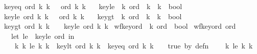 \begin{isabellebody}
{\isachardoublequoteopen}key{\isacharunderscore}eq\ ord\ k{}\ k{}\ {\isacharequal}\ {\isacharparenleft}\ ord\ k{}\ k{}\ {\isacharequal}\ {}{\isacharparenright}{\isachardoublequoteclose}\isanewline
\isanewline
{}\isamarkupfalse%
\ key{\isacharunderscore}le\ {\isacharcolon}{\isacharcolon}\ {\isachardoublequoteopen}{\isacharprime}k\ ord\ {\isasymRightarrow}\ {\isacharprime}k\ {\isasymRightarrow}\ {\isacharprime}k\ {\isasymRightarrow}\ bool{\isachardoublequoteclose}\ \isanewline
{\isachardoublequoteopen}key{\isacharunderscore}le\ ord\ k{}\ k{}\ {\isacharequal}\ {\isacharparenleft}\ ord\ k{}\ k{}\ {\isacharless}{\isacharequal}\ {}{\isacharparenright}{\isachardoublequoteclose}\isanewline
\isanewline
\isanewline
{}\isamarkupfalse%
\ key{\isacharunderscore}gt\ {\isacharcolon}{\isacharcolon}\ {\isachardoublequoteopen}{\isacharprime}k\ ord\ {\isasymRightarrow}\ {\isacharprime}k\ {\isasymRightarrow}\ {\isacharprime}k\ {\isasymRightarrow}\ bool{\isachardoublequoteclose}\ \isanewline
{\isachardoublequoteopen}key{\isacharunderscore}gt\ ord\ k{}\ k{}\ {\isacharequal}\ {\isacharparenleft}{\isachartilde}\ {\isacharparenleft}\ key{\isacharunderscore}le\ ord\ k{}\ k{}{\isacharparenright}{\isacharparenright}{\isachardoublequoteclose}\isanewline
\isanewline
\isanewline
{}\isamarkupfalse%
\ wf{\isacharunderscore}key{\isacharunderscore}ord\ {\isacharcolon}{\isacharcolon}\ {\isachardoublequoteopen}{\isacharprime}k\ ord\ {\isasymRightarrow}\ bool{\isachardoublequoteclose}\ \isanewline
{\isachardoublequoteopen}wf{\isacharunderscore}key{\isacharunderscore}ord\ ord\ {\isacharequal}\ {\isacharparenleft}\isanewline
\ \ let\ le\ {\isacharequal}\ key{\isacharunderscore}le\ ord\ in\isanewline
\ \ {\isacharparenleft}{\isacharbang}\ k{}\ k{}{\isachardot}\ le\ k{}\ k{}\ {\isacharequal}\ {\isacharparenleft}key{\isacharunderscore}lt\ ord\ k{}\ k{}\ {\isacharbar}\ key{\isacharunderscore}eq\ ord\ k{}\ k{}{\isacharparenright}{\isacharparenright}\ {\isacharampersand}\ \ {\isacharparenleft}{\isacharasterisk}\ true\ by\ defn\ {\isacharasterisk}{\isacharparenright}\isanewline
\ \ {\isacharparenleft}{\isacharbang}\ k{}{\isachardot}\ le\ k{}\ k{}{\isacharparenright}\ {\isacharampersand}\isanewline

\end{isabellebody}
